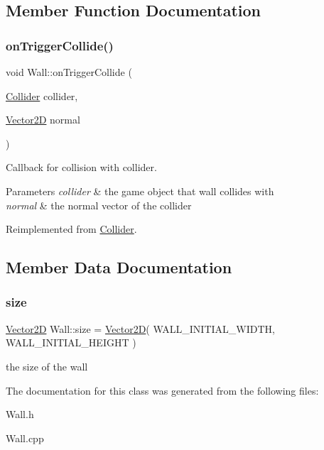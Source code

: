 \subsection{Member Function Documentation}
\mbox{\label{class_wall_a04305c2b9f5030c2fb7270897a5f77a4}} 
\subsubsection{\texorpdfstring{on\+Trigger\+Collide()}{onTriggerCollide()}}
{\footnotesize\ttfamily void Wall\+::on\+Trigger\+Collide (\begin{DoxyParamCaption}\item[{\mbox{\hyperlink{class_collider}{Collider}}}]{collider,  }\item[{\mbox{\hyperlink{struct_vector2_d}{Vector2D}}}]{normal }\end{DoxyParamCaption})\hspace{0.3cm}{\ttfamily [virtual]}}



Callback for collision with collider. 


\begin{DoxyParams}{Parameters}
{\em collider} & the game object that wall collides with \\
\hline
{\em normal} & the normal vector of the collider \\
\hline
\end{DoxyParams}


Reimplemented from \mbox{\hyperlink{class_collider_ae17ec8f9110acbc4df79d5addf8ac401}{Collider}}.



\subsection{Member Data Documentation}
\mbox{\label{class_wall_a8dfde62c05835af7e342468a3270db97}} 
\subsubsection{\texorpdfstring{size}{size}}
{\footnotesize\ttfamily \mbox{\hyperlink{struct_vector2_d}{Vector2D}} Wall\+::size = \mbox{\hyperlink{struct_vector2_d}{Vector2D}}( W\+A\+L\+L\+\_\+\+I\+N\+I\+T\+I\+A\+L\+\_\+\+W\+I\+D\+TH, W\+A\+L\+L\+\_\+\+I\+N\+I\+T\+I\+A\+L\+\_\+\+H\+E\+I\+G\+HT )\hspace{0.3cm}{\ttfamily [private]}}

the size of the wall 

The documentation for this class was generated from the following files\+:\begin{DoxyCompactItemize}
\item 
Wall.\+h\item 
Wall.\+cpp\end{DoxyCompactItemize}
